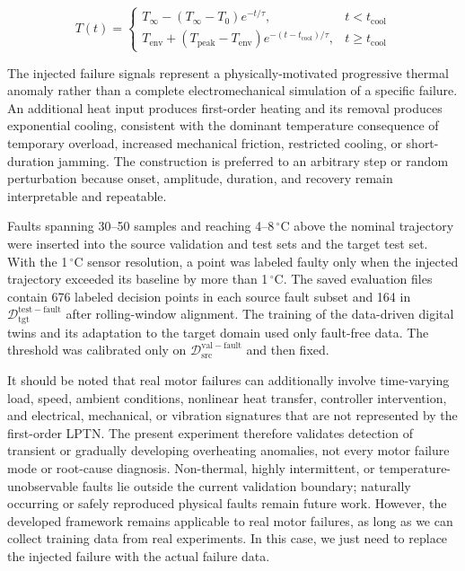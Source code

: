 \documentclass[a4paper,10pt]{cas-sc}%
\newcommand{\rev}[1]{\textcolor{revisionred}{#1}}
\newenvironment{revision}{\color{revisionred}}{}
\begin{document}
\begin{equation}
	T(t) =
	\begin{cases}
		T_{\infty} - (T_{\infty} - T_0) e^{-t/\tau},                                                 & t < t_{\mathrm{cool}}    \\[6pt]
		T_{\mathrm{env}} + (T_{\mathrm{peak}} - T_{\mathrm{env}}) e^{-(t - t_{\mathrm{cool}})/\tau}, & t \geq t_{\mathrm{cool}}
	\end{cases}
	\label{eq:combined}
\end{equation}

\begin{revision}
	The injected failure signals represent a physically-motivated progressive thermal anomaly rather than a complete electromechanical simulation of a specific failure. An additional heat input produces first-order heating and its removal produces exponential cooling, consistent with the dominant temperature consequence of temporary overload, increased mechanical friction, restricted cooling, or short-duration jamming. The construction is preferred to an arbitrary step or random perturbation because onset, amplitude, duration, and recovery remain interpretable and repeatable.

	\rev{Faults spanning 30--50 samples and reaching 4--8\,$^\circ$C above the nominal trajectory were inserted into the source validation and test sets and the target test set. With the 1\,$^\circ$C sensor resolution, a point was labeled faulty only when the injected trajectory exceeded its baseline by more than 1\,$^\circ$C. The saved evaluation files contain 676 labeled decision points in each source fault subset and 164 in $\mathcal{D}_{\mathrm{tgt}}^{\mathrm{test-fault}}$ after rolling-window alignment. The training of the data-driven digital twins and its adaptation to the target domain used only fault-free data. The threshold was calibrated only on $\mathcal{D}_{\mathrm{src}}^{\mathrm{val-fault}}$ and then fixed.}

	It should be noted that real motor failures can additionally involve time-varying load, speed, ambient conditions, nonlinear heat transfer, controller intervention, and electrical, mechanical, or vibration signatures that are not represented by the first-order LPTN. The present experiment therefore validates detection of transient or gradually developing overheating anomalies, not every motor failure mode or root-cause diagnosis. Non-thermal, highly intermittent, or temperature-unobservable faults lie outside the current validation boundary; naturally occurring or safely reproduced physical faults remain future work. However, the developed framework remains applicable to real motor failures, as long as we can collect training data from real experiments. In this case, we just need to replace the injected failure with the actual failure data.
\end{revision}
\end{document}
